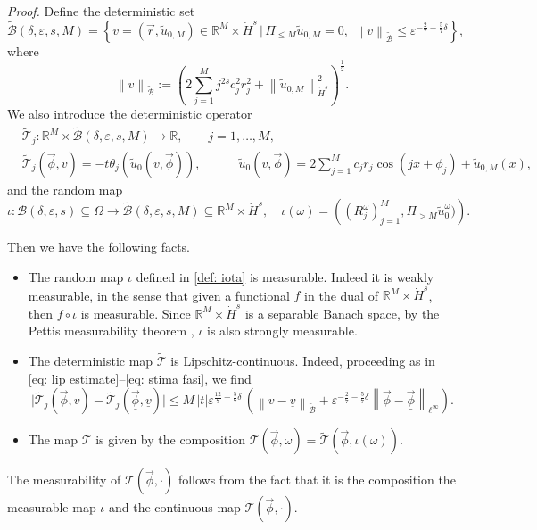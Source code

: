 \documentclass[a4paper,10pt,reqno]{article}
\theoremstyle{definition}
\theoremstyle{plain}
\theoremstyle{plain}
\theoremstyle{definition}
\theoremstyle{plain}
\theoremstyle{plain}
\theoremstyle{plain}
\theoremstyle{definition}
\theoremstyle{definition}
\newcommand{\norm}[1]{\left\lVert #1 \right\rVert}
\def \R{\mathbb R}
\begin{document}
\begin{itemize}
\noindent \emph{Proof.} Define the deterministic set
\[
\widetilde{\mathcal{B}}(\delta,\varepsilon,s,M) = \left \{ v = (\vec{r},\widetilde{u}_{0,M}) \in \R^M \times \dot{H}^s \, \big \lvert \, \Pi_{\le M} \widetilde{u}_{0,M} = 0, \, \, \norm{v}_{\widetilde{\mathcal{B}}} \le \varepsilon^{-\frac27-\frac57 \delta} \right \},
\]
where
\[
\norm{v}_{\widetilde{\mathcal{B}}} := \left ( 2 \sum_{j=1}^M j^{2s} c_j^2 r_j^2 + \norm{\widetilde{u}_{0,M}}_{\dot{H}^s}^2 \right )^{\frac{1}{2}} .
\]
We also introduce the deterministic operator
\begin{equation} \label{def: deterministic phase nonlinear operator}
\begin{split}
& \widetilde{\mathcal{T}}_j : \R^M \times \widetilde{\mathcal{B}}(\delta,\varepsilon,s,M) \rightarrow \R,  \qquad j=1,\ldots,M,\\
& \widetilde{\mathcal{T}}_j(\vec{\phi},v) = -t \theta_j(\widetilde{u}_0(v,\vec{\phi})), \qquad  \quad \widetilde{u}_0(v,\vec{\phi}) = 2 \sum_{j=1}^M c_j r_j \cos(jx+\phi_j) + \widetilde{u}_{0,M}(x),
\end{split}
\end{equation}
and the random map
\begin{equation} \label{def: iota}
\iota : \mathcal{B}(\delta,\varepsilon,s) \subseteq \mathbb{\Omega} \longrightarrow \widetilde{\mathcal{B}}(\delta,\varepsilon,s,M) \subseteq \R^M \times \dot{H}^s, \quad \iota(\omega) = \left ( (R_j^{\omega})_{j = 1}^M , \Pi_{> M} \widetilde{u}_0^{\omega} )  \right ).
\end{equation}

Then we have the following facts.
\begin{itemize}
    \item The random map $\iota$ defined in \eqref{def: iota} is measurable.
    Indeed it is weakly measurable, in the sense that given a functional $f$ in the dual of $\R^M \times \dot{H}^s$, then $f \circ \iota$ is measurable. 
    Since $\R^M \times \dot{H}^s$ is a separable Banach space, by the Pettis measurability theorem \cite{pettis}, $\iota$ is also strongly measurable.
    \item The deterministic map $\widetilde{\mathcal{T}}$ is Lipschitz-continuous. 
    Indeed, proceeding as in \eqref{eq: lip estimate}--\eqref{eq: stima fasi}, we find
    \[
    \lvert \widetilde{\mathcal{T}}_j(\vec{\phi},v) - \widetilde{\mathcal{T}}_j(\underline{\vec{\phi}},\underline{v}) \rvert \le M\, |t| \varepsilon^{\frac{12}{7} - \frac57 \delta}\, \left ( \norm{v-\underline{v}}_{\widetilde{\mathcal{B}}} + \varepsilon^{-\frac27-\frac57 \delta} \norm{\vec{\phi} - \underline{\vec{\phi}} }_{\ell^{\infty}} \right ).
    \]
    \item The map $\mathcal{T}$ is given by the composition $\mathcal{T}(\vec{\phi},\omega) = \widetilde{\mathcal{T}}(\vec{\phi},\iota(\omega))$.
\end{itemize}
The measurability of $\mathcal{T}(\vec{\phi},\cdot)$ follows from the fact that it is the composition the measurable map $\iota$ and the continuous map $\widetilde{\mathcal{T}}(\vec{\phi},\cdot)$.
\end{itemize}
\end{document}
